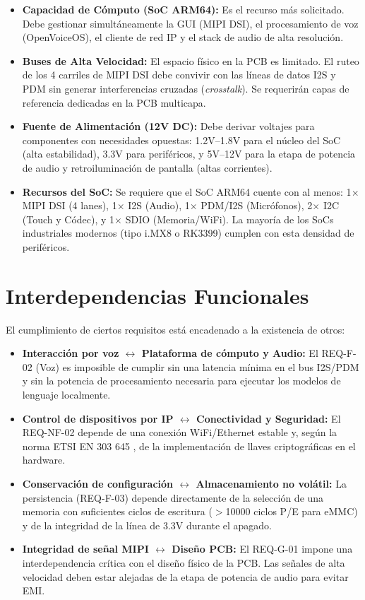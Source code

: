 \documentclass[%
	paper=a4,
	twoside=false,
	parskip=half,
	chapterprefix=false,
	10pt,
	headings=normal,
	bibliography=totoc,
	listof=totoc,
	titlepage=on,
	captions=tableabove,
	draft=false,
]{scrbook}%
\begin{document}
\begin{itemize}
    \item \textbf{Capacidad de Cómputo (SoC ARM64):} Es el recurso más solicitado. Debe gestionar simultáneamente la GUI (MIPI DSI), el procesamiento de voz (OpenVoiceOS), el cliente de red IP y el stack de audio de alta resolución.
    \item \textbf{Buses de Alta Velocidad:} El espacio físico en la PCB es limitado. El ruteo de los 4 carriles de MIPI DSI debe convivir con las líneas de datos I2S y PDM sin generar interferencias cruzadas (\textit{crosstalk}). Se requerirán capas de referencia dedicadas en la PCB multicapa.
    \item \textbf{Fuente de Alimentación (12V DC):} Debe derivar voltajes para componentes con necesidades opuestas: 1.2V–1.8V para el núcleo del SoC (alta estabilidad), 3.3V para periféricos, y 5V–12V para la etapa de potencia de audio y retroiluminación de pantalla (altas corrientes).
    \item \textbf{Recursos del SoC:} Se requiere que el SoC ARM64 cuente con al menos: 1$\times$ MIPI DSI (4 lanes), 1$\times$ I2S (Audio), 1$\times$ PDM/I2S (Micrófonos), 2$\times$ I2C (Touch y Códec), y 1$\times$ SDIO (Memoria/WiFi). La mayoría de los SoCs industriales modernos (tipo i.MX8 o RK3399) cumplen con esta densidad de periféricos.
\end{itemize}

\section{Interdependencias Funcionales}

El cumplimiento de ciertos requisitos está encadenado a la existencia de otros:

\begin{itemize}
    \item \textbf{Interacción por voz $\leftrightarrow$ Plataforma de cómputo y Audio:} El REQ-F-02 (Voz) es imposible de cumplir sin una latencia mínima en el bus I2S/PDM y sin la potencia de procesamiento necesaria para ejecutar los modelos de lenguaje localmente.
    \item \textbf{Control de dispositivos por IP $\leftrightarrow$ Conectividad y Seguridad:} El REQ-NF-02 depende de una conexión WiFi/Ethernet estable y, según la norma ETSI EN 303 645 \cite{etsi303645}, de la implementación de llaves criptográficas en el hardware.
    \item \textbf{Conservación de configuración $\leftrightarrow$ Almacenamiento no volátil:} La persistencia (REQ-F-03) depende directamente de la selección de una memoria con suficientes ciclos de escritura ($>$10000 ciclos P/E para eMMC) y de la integridad de la línea de 3.3V durante el apagado.
    \item \textbf{Integridad de señal MIPI $\leftrightarrow$ Diseño PCB:} El REQ-G-01 impone una interdependencia crítica con el diseño físico de la PCB. Las señales de alta velocidad deben estar alejadas de la etapa de potencia de audio para evitar EMI.
\end{itemize}
\end{document}
